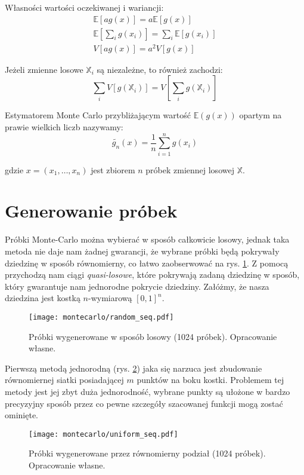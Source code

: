 \documentclass[../main.tex]{subfiles}
\begin{document}
Własności wartości oczekiwanej i wariancji:
\begin{gather*}
\mathbb{E}\left[ag(x)\right] = a \mathbb{E} \left[g(x)\right] \\
\mathbb{E}\left[\sum_{i} g(x_i)\right] = \sum_{i} \mathbb{E} \left[g(x_i)\right] \\
V\left[ ag(x) \right] = a^2 V\left[g(x)\right]
\end{gather*}

Jeżeli zmienne losowe $\mathbb{X}_i$ są niezależne, to również zachodzi:
\[
\sum_{i} V \left[
	g(\mathbb{X}_i)
\right]
=
V \left[
	\sum_{i} g(\mathbb{X}_i)
\right]
\]

Estymatorem Monte Carlo przybliżającym wartość $\mathbb{E}(g(x))$ opartym na
prawie wielkich liczb nazywamy:
\[
\widetilde{g_n}(x) =
	\frac{1}{n}
	\sum_{i=1}^{n}g(x_i)
\]

\noindent gdzie $x=(x_1, \ldots, x_n)$ jest zbiorem $n$ próbek zmiennej
losowej $\mathbb{X}$.

\section{Generowanie próbek}

Próbki Monte-Carlo można wybierać w sposób całkowicie losowy, jednak taka metoda nie daje nam żadnej gwarancji, że wybrane próbki będą pokrywały dziedzinę w sposób równomierny, co łatwo zaobserwować na rys. \ref{fig:RandomSamples}. Z pomocą przychodzą nam ciągi \textit{quasi-losowe}, które pokrywają zadaną dziedzinę w sposób, który gwarantuje nam jednorodne pokrycie dziedziny. Załóżmy, że nasza dziedzina jest kostką $n$-wymiarową $[0,1]^{n}$.

\begin{figure}[h]
  \centering
  \texttt{[image: montecarlo/random\_seq.pdf]}
  \caption{Próbki wygenerowane w sposób losowy (1024 próbek). Opracowanie własne.}
  \label{fig:RandomSamples}
\end{figure}

Pierwszą metodą jednorodną (rys. \ref{fig:UniformSamples}) jaka się narzuca jest zbudowanie równomiernej siatki posiadającej $m$ punktów na boku kostki. Problemem tej metody jest jej zbyt duża jednorodność, wybrane punkty są ułożone w bardzo precyzyjny sposób przez co pewne szczegóły szacowanej funkcji mogą zostać ominięte.

\begin{figure}[h]
  \centering
  \texttt{[image: montecarlo/uniform\_seq.pdf]}
  \caption{Próbki wygenerowane przez równomierny podział (1024 próbek). Opracowanie własne.}
  \label{fig:UniformSamples}
\end{figure}
\end{document}
